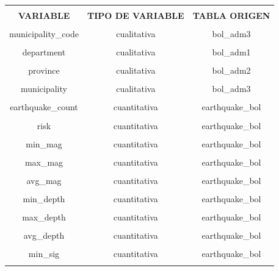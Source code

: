\documentclass[12pt]{article}
\begin{document}
\begin{table}[H]
\centering
\begin{tabular}{c c c}
	\hline\hline & \\[-1.5ex]
		\textbf{VARIABLE} &
		\textbf{TIPO DE VARIABLE} &
		\textbf{TABLA ORIGEN}\\ [0.5ex]
	\hline\hline & \\[1.5ex]
		municipality\_code &
		cualitativa & 
		bol\_adm3
  		\\ [1ex]
	\hline & \\[-1.5ex]
department &
cualitativa	&
bol\_adm1
  	\\ [1ex]
	\hline & \\[-1.5ex]
province & cualitativa & bol\_adm2
  	\\ [1ex]
	\hline & \\[-1.5ex]
municipality & cualitativa & bol\_adm3
  	\\ [1ex]
	\hline & \\[-1.5ex]
earthquake\_count & cuantitativa & earthquake\_bol
  	\\ [1ex]
	\hline & \\[-1.5ex]
	
risk & cuantitativa & earthquake\_bol
  	\\ [1ex]
	\hline & \\[-1.5ex]
	
min\_mag & cuantitativa & earthquake\_bol
  	\\ [1ex]
	\hline & \\[-1.5ex]
	
	max\_mag & cuantitativa & earthquake\_bol
  	\\ [1ex]
	\hline & \\[-1.5ex]
	
	avg\_mag & cuantitativa & earthquake\_bol
  	\\ [1ex]
	\hline & \\[-1.5ex]
	
	min\_depth & cuantitativa & earthquake\_bol
  	\\ [1ex]
	\hline & \\[-1.5ex]
	
	max\_depth & cuantitativa & earthquake\_bol
  	\\ [1ex]
	\hline & \\[-1.5ex]
	
	avg\_depth & cuantitativa & earthquake\_bol
  	\\ [1ex]
	\hline & \\[-1.5ex]
	
	min\_sig & cuantitativa & earthquake\_bol
  	\\ [1ex]
	\hline & \\[-1.5ex]
	

\end{tabular}
\end{table}
\end{document}
